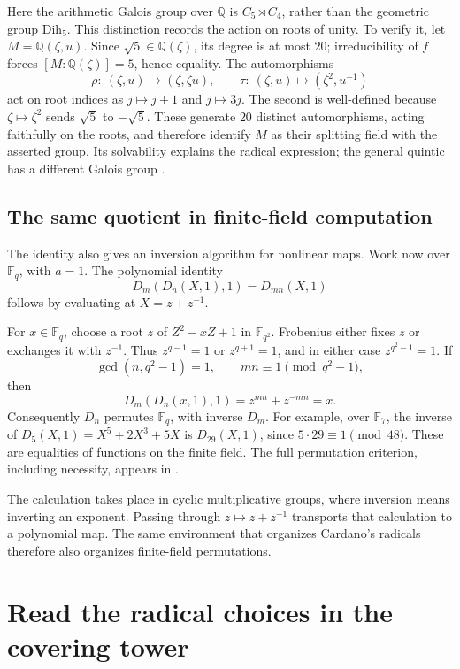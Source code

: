 \documentclass[11pt]{article}
\theoremstyle{remark}
\begin{document}
Here the arithmetic Galois group over \(\mathbb Q\) is \(C_5\rtimes C_4\), rather than the geometric group \(\mathrm{Dih}_5\). This distinction records the action on roots of unity. To verify it, let \(M=\mathbb Q(\zeta,u)\). Since \(\sqrt5\in\mathbb Q(\zeta)\), its degree is at most \(20\); irreducibility of \(f\) forces \([M:\mathbb Q(\zeta)]=5\), hence equality. The automorphisms
\[
\rho:\ (\zeta,u)\longmapsto(\zeta,\zeta u),
\qquad
\tau:\ (\zeta,u)\longmapsto(\zeta^2,u^{-1})
\]
act on root indices as \(j\mapsto j+1\) and \(j\mapsto3j\). The second is well-defined because \(\zeta\mapsto\zeta^2\) sends \(\sqrt5\) to \(-\sqrt5\). These generate \(20\) distinct automorphisms, acting faithfully on the roots, and therefore identify \(M\) as their splitting field with the asserted group. Its solvability explains the radical expression; the general quintic has a different Galois group \cite{milne}.

\subsection{The same quotient in finite-field computation}

The identity also gives an inversion algorithm for nonlinear maps. Work now over \(\mathbb F_q\), with \(a=1\). The polynomial identity
\[
D_m(D_n(X,1),1)=D_{mn}(X,1)
\]
follows by evaluating at \(X=z+z^{-1}\).

For \(x\in\mathbb F_q\), choose a root \(z\) of \(Z^2-xZ+1\) in \(\mathbb F_{q^2}\). Frobenius either fixes \(z\) or exchanges it with \(z^{-1}\). Thus \(z^{q-1}=1\) or \(z^{q+1}=1\), and in either case \(z^{q^2-1}=1\). If
\[
\gcd(n,q^2-1)=1,
\qquad mn\equiv1\pmod{q^2-1},
\]
then
\[
D_m(D_n(x,1),1)=z^{mn}+z^{-mn}=x.
\]
Consequently \(D_n\) permutes \(\mathbb F_q\), with inverse \(D_m\). For example, over \(\mathbb F_7\), the inverse of \(D_5(X,1)=X^5+2X^3+5X\) is \(D_{29}(X,1)\), since \(5\cdot29\equiv1\pmod{48}\). These are equalities of functions on the finite field. The full permutation criterion, including necessity, appears in \cite{bluher}.

The calculation takes place in cyclic multiplicative groups, where inversion means inverting an exponent. Passing through \(z\mapsto z+z^{-1}\) transports that calculation to a polynomial map. The same environment that organizes Cardano's radicals therefore also organizes finite-field permutations.

\section{Read the radical choices in the covering tower}
\end{document}
